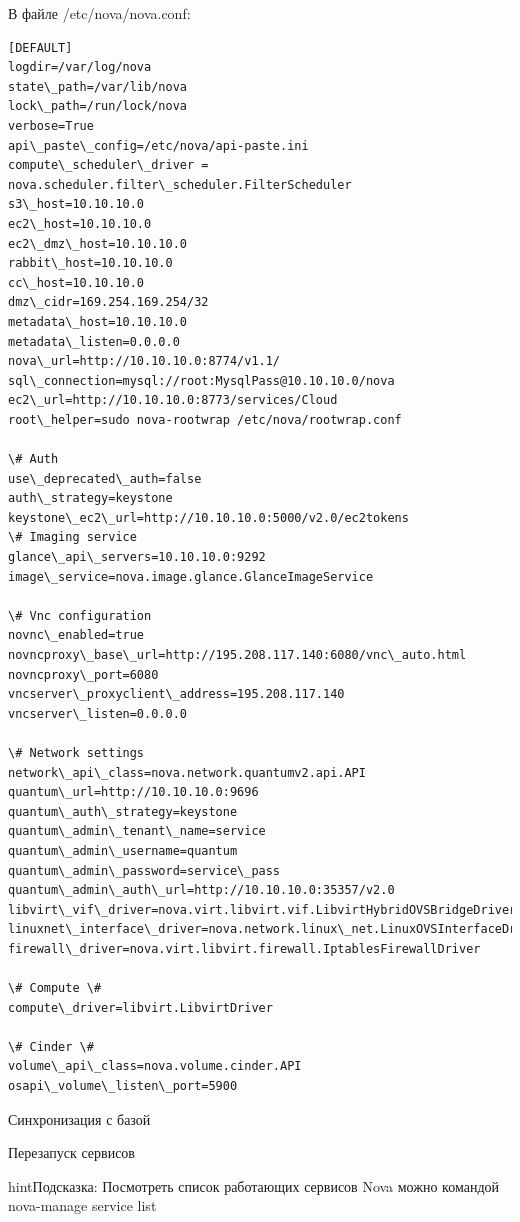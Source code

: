 \documentclass[letterpaper,10pt,russian]{sphinxmanual}
\begin{document}
В файле /etc/nova/nova.conf:

\begin{Verbatim}[commandchars=\\\{\}]
[DEFAULT]
logdir=/var/log/nova
state\_path=/var/lib/nova
lock\_path=/run/lock/nova
verbose=True
api\_paste\_config=/etc/nova/api-paste.ini
compute\_scheduler\_driver = nova.scheduler.filter\_scheduler.FilterScheduler
s3\_host=10.10.10.0
ec2\_host=10.10.10.0
ec2\_dmz\_host=10.10.10.0
rabbit\_host=10.10.10.0
cc\_host=10.10.10.0
dmz\_cidr=169.254.169.254/32
metadata\_host=10.10.10.0
metadata\_listen=0.0.0.0
nova\_url=http://10.10.10.0:8774/v1.1/
sql\_connection=mysql://root:MysqlPass@10.10.10.0/nova
ec2\_url=http://10.10.10.0:8773/services/Cloud
root\_helper=sudo nova-rootwrap /etc/nova/rootwrap.conf

\# Auth
use\_deprecated\_auth=false
auth\_strategy=keystone
keystone\_ec2\_url=http://10.10.10.0:5000/v2.0/ec2tokens
\# Imaging service
glance\_api\_servers=10.10.10.0:9292
image\_service=nova.image.glance.GlanceImageService

\# Vnc configuration
novnc\_enabled=true
novncproxy\_base\_url=http://195.208.117.140:6080/vnc\_auto.html
novncproxy\_port=6080
vncserver\_proxyclient\_address=195.208.117.140
vncserver\_listen=0.0.0.0

\# Network settings
network\_api\_class=nova.network.quantumv2.api.API
quantum\_url=http://10.10.10.0:9696
quantum\_auth\_strategy=keystone
quantum\_admin\_tenant\_name=service
quantum\_admin\_username=quantum
quantum\_admin\_password=service\_pass
quantum\_admin\_auth\_url=http://10.10.10.0:35357/v2.0
libvirt\_vif\_driver=nova.virt.libvirt.vif.LibvirtHybridOVSBridgeDriver
linuxnet\_interface\_driver=nova.network.linux\_net.LinuxOVSInterfaceDriver
firewall\_driver=nova.virt.libvirt.firewall.IptablesFirewallDriver

\# Compute \#
compute\_driver=libvirt.LibvirtDriver

\# Cinder \#
volume\_api\_class=nova.volume.cinder.API
osapi\_volume\_listen\_port=5900
\end{Verbatim}

Синхронизация с базой



Перезапуск сервисов


\begin{notice}{hint}{Подсказка:}
Посмотреть список работающих сервисов Nova можно командой nova-manage service list
\end{notice}
\end{document}
